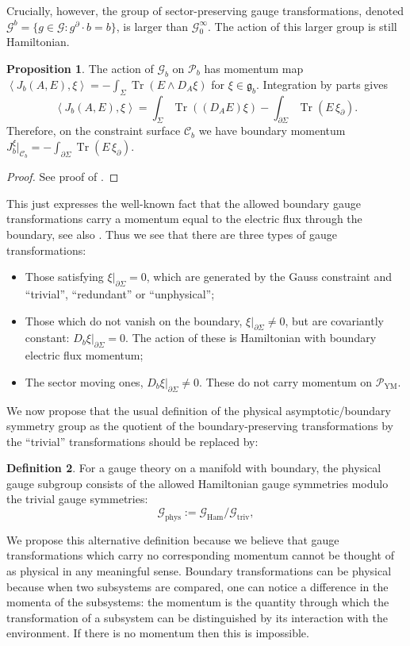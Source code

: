 \documentclass{article}
\theoremstyle{definition}
\newtheorem{definition}{Definition}[section]
\newtheorem{proposition}[definition]{Proposition}
\begin{document}
Crucially, however, the group of sector-preserving gauge transformations, denoted $\mathcal{G}^b=\{g\in \mathcal{G}:g^\partial\cdot b=b\}$, is larger than $\mathcal{G}^\infty_0$. The action of this larger group is still Hamiltonian.

\begin{proposition}\label{prop:sectorboundarymomentum}
The action of \(\mathcal G_b\) on \(\mathcal{P}_b\) has momentum map $\left\langle J_b(A,E),\xi\right\rangle
=
-\int_\Sigma\operatorname{Tr}(E\wedge D_A\xi)$ for $
\xi\in\mathfrak g_b$.
Integration by parts gives
\[
\left\langle J_b(A,E),\xi\right\rangle
=
\int_\Sigma\operatorname{Tr}((D_AE)\xi)
-
\int_{\partial\Sigma}\operatorname{Tr}(E\,\xi_\partial).
\]
Therefore, on the constraint surface \(\mathcal C_b\) we have boundary momentum $J_b^\xi|_{\mathcal C_b}
=
-\int_{\partial\Sigma}\operatorname{Tr}(E\,\xi_\partial)$.
\end{proposition}
\begin{proof}
    See proof of \cite[Proposition 4.2]{Borsboom:2025agn}.
\end{proof}
This just expresses the well-known fact that the allowed boundary gauge transformations carry a momentum equal to the electric flux through the boundary, see also \cite{rielloHamiltonianGaugeTheory2024}. Thus we see that there are three types of gauge transformations: 
\begin{itemize}
    \item Those satisfying $\xi|_{\partial\Sigma}=0$, which are generated by the Gauss constraint and ``trivial'', ``redundant'' or ``unphysical'';
    \item Those which do not vanish on the boundary, $\xi|_{\partial\Sigma}\neq 0$, but are covariantly constant: $D_b\xi|_{\partial\Sigma}=0$. The action of these is Hamiltonian with boundary electric flux momentum;
    \item The sector moving ones, $D_b\xi|_{\partial\Sigma}\neq 0$. These do not carry momentum on $\mathcal{P}_\text{YM}$.
\end{itemize}

We now propose that the usual definition of the physical asymptotic/boundary symmetry group as the quotient of the boundary-preserving transformations by the ``trivial'' transformations should be replaced by:
\begin{definition}\label{def:physicalgaugegroup}
For a gauge theory on a manifold with boundary, the physical gauge subgroup consists of the allowed Hamiltonian
gauge symmetries modulo the trivial gauge symmetries:
\[
\mathcal G_{\mathrm{phys}}
:=
\mathcal{G}_{\mathrm{Ham}}/
     \mathcal G_{\mathrm{triv}},
\]
\end{definition}
We propose this alternative definition because we believe that gauge transformations which carry no corresponding momentum cannot be thought of as physical in any meaningful sense. Boundary transformations can be physical because when two subsystems are compared, one can notice a difference in the momenta of the subsystems:  the momentum is the
quantity through which the transformation of a subsystem can be distinguished by its
interaction with the environment. If there is no momentum then this is impossible.
\end{document}
